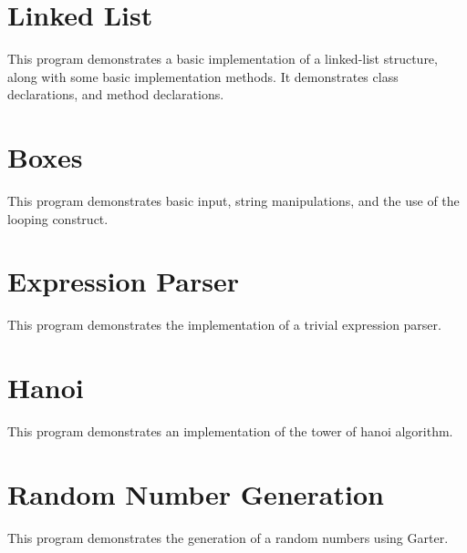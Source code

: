 \section{Linked List}

This program demonstrates a basic implementation of a linked-list structure,
along with some basic implementation methods. It demonstrates class
declarations, and method declarations.



\section{Boxes}

This program demonstrates basic input, string manipulations, and the use of the
 looping construct.



\section{Expression Parser}

This program demonstrates the implementation of a trivial expression parser.



\section{Hanoi}

This program demonstrates an implementation of the tower of hanoi algorithm.



\section{Random Number Generation}

This program demonstrates the generation of a random numbers using Garter.



